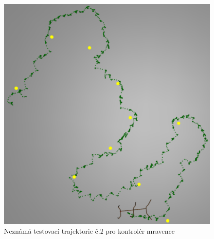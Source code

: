\begin{figure}[h]
    \begin{minipage}[c]{0.48\linewidth}
        \includegraphics[width=\linewidth]{obrazky/mravenec_testovaci_trajektorie2.png}
        \caption{Neznámá testovací trajektorie č.2 pro kontrolér mravence}
        \label{fig:mravenec_testovaci_trajektorie2}


\end{minipage}
\end{figure}
